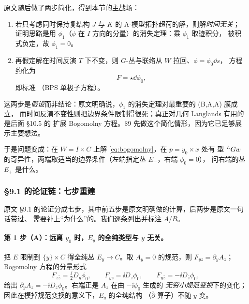 原文随后做了两步简化，得到本节的主战场：
\begin{enumerate}
\item 若只考虑同时保持复结构 $J$ 与 $K$ 的 A-模型拓扑超荷的解，则解\emph{时间无关}；
  证明思路是用 $\phi_1$（$\phi$ 在 $I$ 方向的分量）的消失定理：乘 $\phi_1$ 取迹积分，
  被积式负定，故 $\phi_1=0$。\pA{}
\item 再假定解在时间反演 $T$ 下不变，则 $G$-丛与联络从 $W$ 拉回、$\phi=\phi_0\dd s$，
  方程约化为
  \begin{equation}
  F=\star\dd\phi_0,
  \label{eq:bogomolny}
  \end{equation}
  即标准 （BPS 单极子方程）。\pA{}
\end{enumerate}

这两步是\emph{假设}而非结论：原文明确说，$\phi_1$ 的消失定理对最重要的 (B,A,A) 膜成立，
而时间反演不变性则把边界条件限制得很死；真正对几何 Langlands 有用的是后面 §10.5 的
扩展 Bogomolny 方程。\$9 先做这个简化情形，因为它已足够展示主要想法。\pA{}

于是问题变成：在 $W=I\times C$ 上解 \eqref{eq:bogomolny}，在 $p=y_0\times x$ 处有
型 ${}^{L}G w$ 的奇异性，两端取适当的边界条件（左端指定丛 $E_-$，右端 $\phi_0=0$），
问右端的丛 $E_+$ 是什么。\pA{}

\subsubsection{§9.1 的论证链：七步重建}

原文 §9.1 的论证分成七步，其中前五步是原文明确做的计算，后两步是原文一句话带过、
需要补上“为什么”的。我们逐条列出并标注 $A$/$B$。

\paragraph{第 1 步（A）：远离 $y_0$ 时，$E_y$ 的全纯类型与 $y$ 无关。}
把 $E$ 限制到 $\{y\}\times C$ 得全纯丛 $E_y\to C$。取 $A_y=0$ 的规范，则
$F_{yz}=\partial_yA_z$；Bogomolny 方程的分量形式
\begin{equation}
F_{z\bar z}=\tfrac{\ii}{2}D_y\phi_0,\qquad
F_{yz}=\ii D_z\phi_0,\qquad
F_{y\bar z}=-\ii D_{\bar z}\phi_0,
\label{eq:bogcomponents}
\end{equation}
给出 $\partial_yA_z=-\ii D_z\phi_0$。右端正是 $A_z$ 在由 $-\ii\phi_0$ 生成的
\emph{无穷小规范变换}下的变化；因此在模掉规范变换的意义下，$E_y$ 的全纯结构
（$\bar\partial$ 算子）不随 $y$ 变。\pA{}

